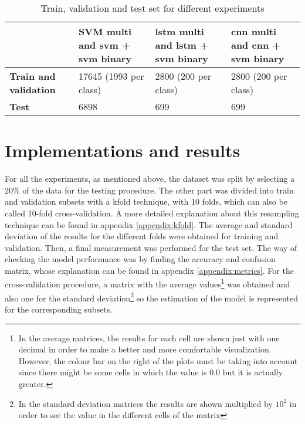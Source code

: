 	\begin{table}[ht]
		\centering
		\begin{tabular}{|| m{7em} | m{10em} | m{10em} | m{10em} ||}
			\hline
			& \textbf{SVM multi and \acrshort{svm} + \acrshort{svm} binary} & \textbf{\acrshort{lstm} multi and \acrshort{lstm} + \acrshort{svm} binary} & \textbf{\acrshort{cnn} multi and \acrshort{cnn} + \acrshort{svm} binary}  \\
			\hline\hline
			\textbf{Train and validation} & 17645 (1993 per class) & 2800 (200 per class) & 2800 (200 per class) \\
			\hline
			\textbf{Test} & 6898 & 699 & 699 \\
			\hline                    
		\end{tabular}
		\caption{Train, validation and test set for different experiments}
		\label{table:8}
	\end{table}

\section{Implementations and results}

	For all the experiments, as mentioned above, the dataset was split by selecting a 20\% of the data for the testing procedure. The other part was divided into train and validation subsets with a \acrlong{kfold} technique, with 10 folds, which can also be called 10-fold cross-validation. A more detailed explanation about this resampling technique can be found in appendix \ref{appendix:kfold}. The average and standard deviation of the results for the different folds were obtained for training and validation. Then, a final measurement was performed for the test set. The way of checking the model performance was by finding the accuracy and confusion matrix, whose explanation can be found in appendix \ref{appendix:metrics}. For the cross-validation procedure, a matrix with the average values\footnote{In the average matrices, the results for each cell are shown just with one decimal in order to make a better and more comfortable visualization. However, the colour bar on the right of the plots must be taking into account since there might be some cells in which the value is $0.0$ but it is actually greater.} was obtained and also one for the standard deviation\footnote{In the standard deviation matrices the results are shown multiplied by $10^{2}$ in order to see the value in the different cells of the matrix} so the estimation of the model is represented for the corresponding subsets.
	
